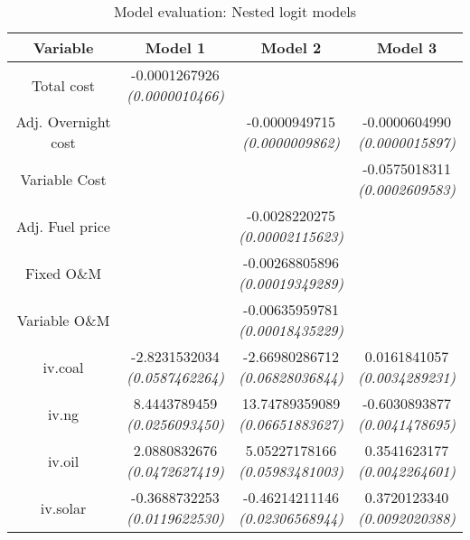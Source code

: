 \documentclass[10pt]{amsart}
\begin{document}
\begin{table}[H]
\caption{Model evaluation: Nested logit models}
\centering
\begin{tabular}{c c c c}
\hline
\hline
Variable & Model 1 & Model 2 & Model 3\\ [0.5ex]
\hline
Total cost & \makecell{-0.0001267926 \\ {\footnotesize\textit{(0.0000010466)}}} & & \\
Adj. Overnight cost & & \makecell{-0.0000949715 \\ {\footnotesize\textit{(0.0000009862)}}} & \makecell{-0.0000604990 \\ {\footnotesize\textit{(0.0000015897)}}} \\
Variable Cost & & & \makecell{-0.0575018311 \\ {\footnotesize\textit{(0.0002609583)}}} \\
Adj. Fuel price & & \makecell{-0.0028220275 \\ {\footnotesize\textit{(0.00002115623)}}} & \\
Fixed O\&M & & \makecell{-0.00268805896 \\ {\footnotesize\textit{(0.00019349289)}}} &\\
Variable O\&M & & \makecell{-0.00635959781 \\ {\footnotesize\textit{(0.00018435229)}}} &\\
iv.coal & \makecell{-2.8231532034 \\ {\footnotesize\textit{(0.0587462264)}}} & \makecell{-2.66980286712 \\ {\footnotesize\textit{(0.06828036844)}}} & \makecell{0.0161841057 \\ {\footnotesize\textit{(0.0034289231)}}} \\
iv.ng & \makecell{8.4443789459 \\ {\footnotesize\textit{(0.0256093450)}}} & \makecell{13.74789359089 \\ {\footnotesize\textit{(0.06651883627)}}} & \makecell{-0.6030893877 \\ {\footnotesize\textit{(0.0041478695)}}} \\
iv.oil & \makecell{2.0880832676 \\ {\footnotesize\textit{(0.0472627419)}}} & \makecell{5.05227178166 \\ {\footnotesize\textit{(0.05983481003)}}} & \makecell{0.3541623177 \\ {\footnotesize\textit{(0.0042264601)}}} \\
iv.solar & \makecell{-0.3688732253 \\ {\footnotesize\textit{(0.0119622530)}}} & \makecell{-0.46214211146 \\ {\footnotesize\textit{(0.02306568944)}}} & \makecell{0.3720123340 \\ {\footnotesize\textit{(0.0092020388)}}} \\

\end{tabular}
\end{table}
\end{document}
